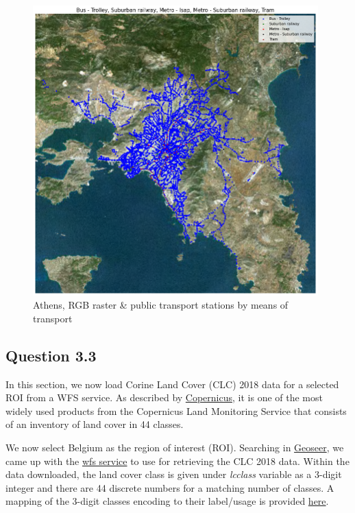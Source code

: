 \begin{figure}[h]
    \centering
    \includegraphics[width=11cm]{figures/q3_2_athens_oasa_split.png}
    \caption{Athens, RGB raster & public transport stations by means of transport}
    \label{fig:Athens, RGB raster & public transport stations by means of transport}
\end{figure}
\FloatBarrier %

\subsection{Question 3.3}
In this section, we now load Corine Land Cover (CLC) 2018 data for a selected ROI from a WFS service. As described by \href{https://land.copernicus.eu/news/corine-land-cover-now-updated-for-the-2018-reference-year}{Copernicus}, it is one of the most widely used products from the Copernicus Land Monitoring Service that consists of an inventory of land cover in 44 classes.

We now select Belgium as the region of interest (ROI). Searching in \href{https://www.geoseer.net/}{Geoseer}, we came up with the \href{https://wms.ngi.be/inspire23/landcover/wfs}{wfs service} to use for retrieving the CLC 2018 data. Within the data downloaded, the land cover class is given under \emph{lcclass} variable as a 3-digit integer and there are 44 discrete numbers for a matching number of classes. A mapping of the 3-digit classes encoding to their label/usage is provided \href{https://collections.sentinel-hub.com/corine-land-cover/readme.html}{here}.

